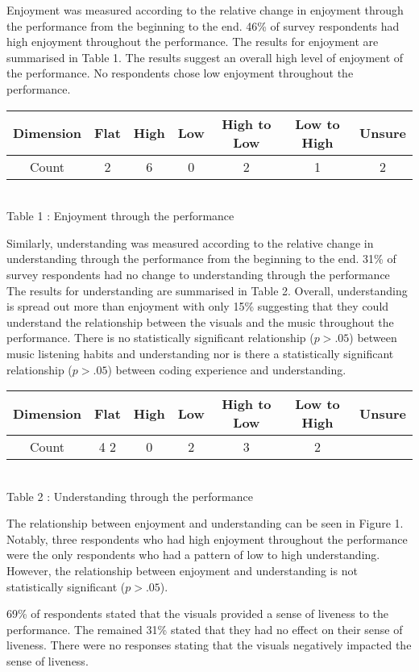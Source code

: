 Enjoyment was measured according to the relative change in enjoyment through the performance from the beginning to the end. 46\% of survey respondents had high enjoyment throughout the performance. The results for enjoyment are summarised in Table 1. The results suggest an overall high level of enjoyment of the performance. No respondents chose  low enjoyment throughout the performance.\\


\begin{tabular}{|c|c|c|c|c|c|c|}
\hline 
Dimension & Flat & High & Low & High to Low & Low to High & Unsure\\
\hline 
Count & 2 &6 &0 &2 &1 &2\\
\hline
\end{tabular}\\
Table 1 : Enjoyment through the performance

Similarly, understanding was measured according to the relative change in understanding through the performance from the beginning to the end. 31\% of survey respondents had no change to understanding through the performance   The results for understanding are summarised in Table 2. Overall, understanding is spread out more than enjoyment with only 15\% suggesting that they could understand the relationship between the visuals and the music throughout the performance. There is no statistically significant relationship ($p > .05$) between music listening habits and understanding nor is there a statistically significant relationship ($p > .05$) between coding experience and understanding.\\

\begin{tabular}{|c|c|c|c|c|c|c|}
\hline 
Dimension & Flat & High & Low & High to Low & Low to High & Unsure\\
\hline 
Count & 4
2&
0&
2&
3&
2 \\
\hline
\end{tabular}\\
Table 2 : Understanding through the performance

The relationship between enjoyment and understanding can be seen in Figure 1. Notably, three respondents who had high enjoyment throughout the performance were the only respondents who had a pattern of low to high understanding. However, the relationship between enjoyment and understanding is not statistically significant ($p > .05$).

69\% of respondents stated that the visuals provided a sense of liveness to the performance. The remained 31\% stated that they had no effect on their sense of liveness. There were no responses stating that the visuals negatively impacted the sense of liveness. 

